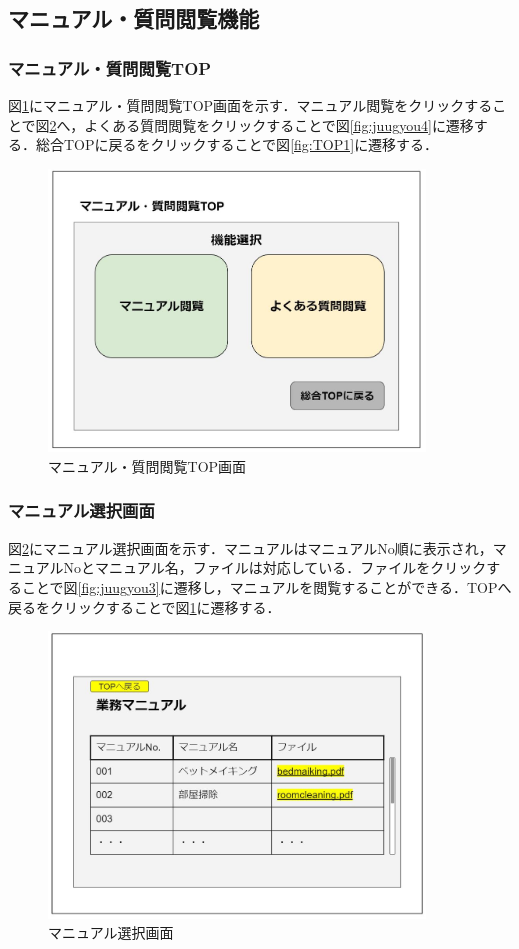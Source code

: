 \documentclass[main]{subfiles}
\begin{document}
\subsection{マニュアル・質問閲覧機能}
\subsubsection{マニュアル・質問閲覧TOP}
図\ref{fig:juugyou1}にマニュアル・質問閲覧TOP画面を示す．マニュアル閲覧をクリックすることで図\ref{fig:juugyou2}へ，よくある質問閲覧をクリックすることで図\ref{fig:juugyou4}に遷移する．総合TOPに戻るをクリックすることで図\ref{fig:TOP1}に遷移する．

\begin{figure}[H]
 \centering
   \includegraphics[width=100mm]{UI-umino/juugyou1.JPG}
 \caption{マニュアル・質問閲覧TOP画面}
 \label{fig:juugyou1}
\end{figure}

\subsubsection{マニュアル選択画面}
図\ref{fig:juugyou2}にマニュアル選択画面を示す．マニュアルはマニュアルNo順に表示され，マニュアルNoとマニュアル名，ファイルは対応している．ファイルをクリックすることで図\ref{fig:juugyou3}に遷移し，マニュアルを閲覧することができる．TOPへ戻るをクリックすることで図\ref{fig:juugyou1}に遷移する．

\begin{figure}[H]
 \centering
   \includegraphics[width=100mm]{UI-umino/juugyou2.JPG}
 \caption{マニュアル選択画面}
 \label{fig:juugyou2}
\end{figure}
\end{document}
